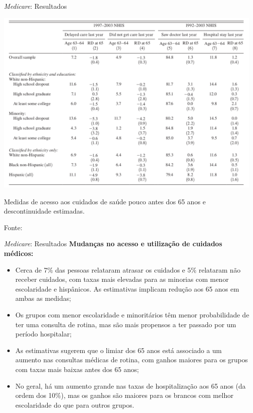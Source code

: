 \documentclass[aspectratio=1610, 10pt]{beamer}
\begin{document}
\begin{frame}{\textit{Medicare}: Resultados}
    \begin{table}
            \centering
            \includegraphics[scale = 0.41]{FigurasAplicacao/tabelaConsulta.png}
            \vspace{-0.3cm}
            \caption{Medidas de acesso aos cuidados de saúde pouco antes dos 65 anos e descontinuidade estimadas.}
            \tiny{Fonte: \cite{card2008impact}}
            \label{tab_consulta}
        \end{table}
\end{frame}

\begin{frame}{\textit{Medicare}: Resultados}
    \textbf{Mudanças no acesso e utilização de cuidados médicos:}
    \begin{itemize}
        \item Cerca de 7\% das pessoas relataram atrasar os cuidados e 5\% relataram não receber cuidados, com taxas mais elevadas para as minorias com menor escolaridade e hispânicos. As estimativas implicam redução aos 65 anos em ambas as medidas;
        \item Os grupos com menor escolaridade e minoritários têm menor probabilidade de ter uma consulta de rotina, mas são mais propensos a ter passado por um período hospitalar;
        \item As estimativas sugerem que o limiar dos 65 anos está associado a um aumento nas consultas médicas de rotina, com ganhos maiores para os grupos com taxas mais baixas antes dos 65 anos;
        \item No geral, há um aumento grande nas taxas de hospitalização aos 65 anos (da ordem dos 10\%), mas os ganhos são maiores para os brancos com melhor escolaridade do que para outros grupos.
    \end{itemize}
\end{frame}
\end{document}
